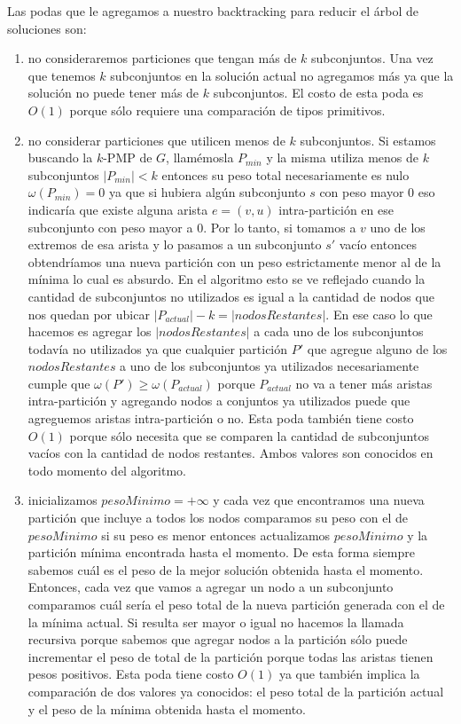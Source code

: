 Las podas que le agregamos a nuestro backtracking para reducir el árbol de soluciones son:
\begin{enumerate}
  \item no consideraremos particiones que tengan más de $k$ subconjuntos. Una vez que tenemos
    $k$ subconjuntos en la solución actual no agregamos más ya que la solución no puede tener
    más de $k$ subconjuntos. El costo de esta poda es $O(1)$ porque sólo requiere una comparación
    de tipos primitivos.

  \item no considerar particiones que utilicen menos de $k$ subconjuntos. Si estamos
    buscando la $k$-PMP de $G$, llamémosla $P_{min}$ y la misma utiliza menos de $k$ subconjuntos 
    $|P_{min}| < k$ entonces su peso total necesariamente es nulo $\omega(P_{min}) = 0$ ya que si
    hubiera algún subconjunto $s$ con peso mayor 0 eso indicaría que existe alguna arista $e = (v, u)$ intra-partición
    en ese subconjunto con peso mayor a 0. Por lo tanto, si tomamos a $v$ uno de los extremos de esa
    arista y lo pasamos a un subconjunto $s'$ vacío entonces obtendríamos una nueva partición con un peso
    estrictamente menor al de la mínima lo cual es absurdo.
    En el algoritmo esto se ve reflejado cuando la cantidad de subconjuntos no utilizados es igual a la cantidad 
    de nodos que nos quedan por ubicar $|P_{actual}|-k = |nodosRestantes|$. En ese caso lo que hacemos es agregar los $|nodosRestantes|$
    a cada uno de los subconjuntos todavía no utilizados ya que cualquier partición $P'$ que agregue alguno
    de los $nodosRestantes$ a uno de los subconjuntos ya utilizados necesariamente cumple que 
    $\omega(P') \geq \omega(P_{actual})$ porque $P_{actual}$ no va a tener más aristas intra-partición
    y agregando nodos a conjuntos ya utilizados puede que agreguemos aristas intra-partición o no.
    Esta poda también tiene costo $O(1)$ porque sólo necesita que se comparen la cantidad de subconjuntos
    vacíos con la cantidad de nodos restantes. Ambos valores son conocidos en todo momento del algoritmo.

  \item inicializamos $pesoMinimo = +\infty$ y cada vez que encontramos una nueva partición que incluye a todos
    los nodos comparamos su peso con el de $pesoMinimo$ si su peso es menor entonces actualizamos $pesoMinimo$
    y la partición mínima encontrada hasta el momento. De esta forma siempre sabemos cuál es el peso de la mejor 
    solución obtenida hasta el momento. Entonces, cada vez que vamos a agregar un nodo a un subconjunto comparamos
    cuál sería el peso total de la nueva partición generada con el de la mínima actual. Si resulta ser mayor o igual
    no hacemos la llamada recursiva porque sabemos que agregar nodos a la partición sólo puede incrementar el peso
    de total de la partición porque todas las aristas tienen pesos positivos. Esta poda tiene costo $O(1)$ ya
    que también implica la comparación de dos valores ya conocidos: el peso total de la partición actual
    y el peso de la mínima obtenida hasta el momento.


\end{enumerate}
